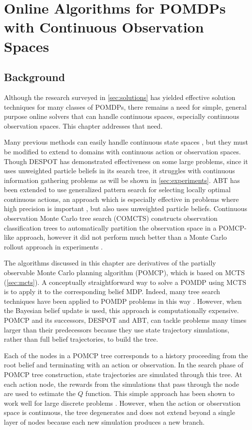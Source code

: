 \chapter{Online Algorithms for POMDPs with Continuous Observation Spaces}

\section{Background}

Although the research surveyed in \cref{sec:solutions} has yielded effective solution techniques for many classes of POMDPs, there remains a need for simple, general purpose online solvers that can handle continuous spaces, especially continuous observation spaces.
This chapter addresses that need.

Many previous methods can easily handle continuous state spaces \cite{goldhoorn2014continuous}, but they must be modified to extend to domains with continuous action or observation spaces.
Though DESPOT has demonstrated effectiveness on some large problems, since it uses unweighted particle beliefs in its search tree, it struggles with continuous information gathering problems as will be shown in \cref{sec:experiments}.
ABT has been extended to use generalized pattern search for selecting locally optimal continuous actions, an approach which is especially effective in problems where high precision is important \cite{seiler2015online}, but also uses unweighted particle beliefs.
Continuous observation Monte Carlo tree search (COMCTS) constructs observation classification trees to automatically partition the observation space in a POMCP-like approach, however it did not perform much better than a Monte Carlo rollout approach in experiments \cite{pas2012simulation}.

The algorithms discussed in this chapter are derivatives of the partially observable Monte Carlo planning algorithm (POMCP), which is based on MCTS (\cref{sec:mcts}).
A conceptually straightforward way to solve a POMDP using MCTS is to apply it to the corresponding belief MDP.
Indeed, many tree search techniques have been applied to POMDP problems in this way \cite{ross2008online}.
However, when the Bayesian belief update is used, this approach is computationally expensive.
POMCP and its successors, DESPOT and ABT, can tackle problems many times larger than their predecessors because they use state trajectory simulations, rather than full belief trajectories, to build the tree.

Each of the nodes in a POMCP tree corresponds to a history proceeding from the root belief and terminating with an action or observation.
In the search phase of POMCP tree construction, state trajectories are simulated through this tree.
At each action node, the rewards from the simulations that pass through the node are used to estimate the $Q$ function.
This simple approach has been shown to work well for large discrete problems \cite{silver2010pomcp}.
However, when the action or observation space is continuous, the tree degenerates and does not extend beyond a single layer of nodes because each new simulation produces a new branch.

